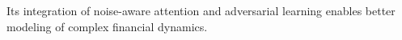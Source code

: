 Its integration of noise-aware attention and adversarial learning enables better modeling of complex financial dynamics.







    
